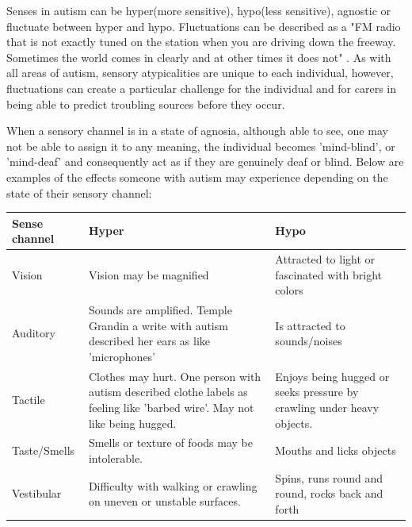 \documentclass[11pt]{report}
\begin{document}
Senses in autism can be hyper(more sensitive), hypo(less sensitive), agnostic or fluctuate between hyper and hypo\cite{bayes}. Fluctuations can be described as a "FM radio that is not exactly tuned on the station when you are driving down the freeway. Sometimes the world comes in clearly and at other times it does not" \cite{olgab}. As with all areas of autism, sensory atypicalities are unique to each individual, however, fluctuations can create a particular challenge for the individual and for carers in being able to predict troubling sources before they occur. 

When a sensory channel is in a state of agnosia, although able to see, one may not be able to assign it to any meaning, the individual becomes 'mind-blind', or 'mind-deaf' and consequently act as if they are genuinely deaf or blind. Below are examples of the effects someone with autism may experience depending on the state of their sensory channel:

\begin{table}[H]
    \begin{tabular}{| l | p{5cm} | p{5cm} |}
    \hline
    Sense channel & Hyper                                                                                                                      & Hypo                                                                   \\
    \hline
    \hline
    Vision        & Vision may be magnified                                                                                                    & Attracted to light or fascinated with bright colors                    \\
    \hline
    Auditory      & Sounds are amplified. Temple Grandin a write with autism described her ears as like 'microphones'                          & Is attracted to sounds/noises                                          \\
    \hline
    Tactile       & Clothes may hurt. One person with autism described clothe labels as feeling like 'barbed wire'. May not like being hugged. & Enjoys being hugged or seeks pressure by crawling under heavy objects. \\
    \hline
    Taste/Smells & Smells or texture of foods may be intolerable. & Mouths and licks objects \\
    \hline
    Vestibular & Difficulty with walking or crawling on uneven or unstable surfaces. & Spins, runs round and round, rocks back and forth \\
    \hline
    \end{tabular}
\end{table}
\end{document}
